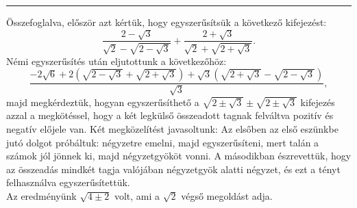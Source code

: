 \documentclass{article}
\begin{document}
\subsubsection[Összefoglalás]{}
\vspace{-8pt}
\hrule
\vspace{10pt}
Összefoglalva, először azt kértük, hogy egyszerűsítsük a következő kifejezést:
\[
\frac{2 - \sqrt{3}}{\sqrt{2} - \sqrt{2 - \sqrt{3}}} + \frac{2 + \sqrt{3}}{\sqrt{2} + \sqrt{2 + \sqrt{3}}}.
\]
Némi egyszerűsítés után eljutottunk a következőhöz:
\[
\frac{-2\sqrt{6} + 2(\sqrt{2 - \sqrt{3}} + \sqrt{2 + \sqrt{3}}) + \sqrt{3}(\sqrt{2 + \sqrt{3}} - \sqrt{2 - \sqrt{3}})}{\sqrt{3}},
\]
majd megkérdeztük, hogyan egyszerűsíthető a $\sqrt{2 \pm \sqrt{3}} \pm \sqrt{2 \pm \sqrt{3}}$ kifejezés azzal a megkötéssel, hogy a két legkülső összeadott tagnak felváltva pozitív és negatív előjele van.
Két megközelítést javasoltunk: Az elsőben az első eszünkbe jutó dolgot próbáltuk: négyzetre emelni, majd egyszerűsíteni, mert talán a számok jól jönnek ki, majd négyzetgyököt vonni. A másodikban észrevettük, hogy az összeadás mindkét tagja valójában négyzetgyök alatti négyzet, és ezt a tényt felhasználva egyszerűsítettük.\\

Az eredményünk $\sqrt{4 \pm 2}$ volt, ami a $\sqrt{2}$ végső megoldást adja.
\end{document}
